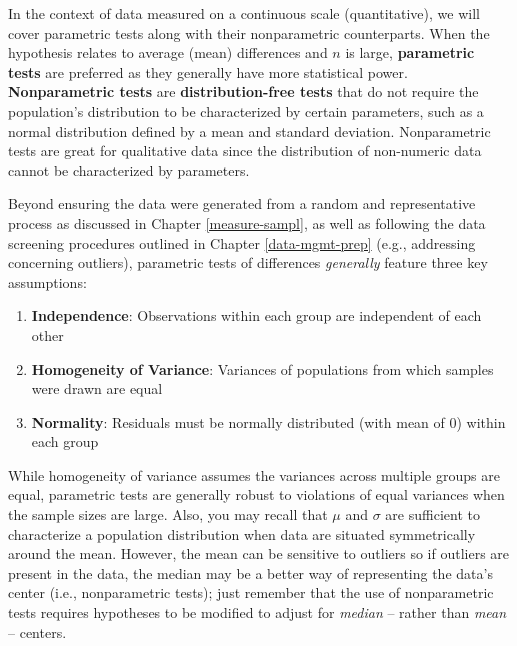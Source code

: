 \documentclass[
]{book}
\providecommand{\tightlist}{%
  \setlength{\itemsep}{0pt}\setlength{\parskip}{0pt}}
\begin{document}
In the context of data measured on a continuous scale (quantitative), we will cover parametric tests along with their nonparametric counterparts. When the hypothesis relates to average (mean) differences and \(n\) is large, \textbf{parametric tests} are preferred as they generally have more statistical power. \textbf{Nonparametric tests} are \textbf{distribution-free tests} that do not require the population's distribution to be characterized by certain parameters, such as a normal distribution defined by a mean and standard deviation. Nonparametric tests are great for qualitative data since the distribution of non-numeric data cannot be characterized by parameters.

Beyond ensuring the data were generated from a random and representative process as discussed in Chapter \ref{measure-sampl}, as well as following the data screening procedures outlined in Chapter \ref{data-mgmt-prep} (e.g., addressing concerning outliers), parametric tests of differences \emph{generally} feature three key assumptions:

\begin{enumerate}
\def\labelenumi{\arabic{enumi}.}
\tightlist
\item
  \textbf{Independence}: Observations within each group are independent of each other
\item
  \textbf{Homogeneity of Variance}: Variances of populations from which samples were drawn are equal
\item
  \textbf{Normality}: Residuals must be normally distributed (with mean of 0) within each group
\end{enumerate}

While homogeneity of variance assumes the variances across multiple groups are equal, parametric tests are generally robust to violations of equal variances when the sample sizes are large. Also, you may recall that \(\mu\) and \(\sigma\) are sufficient to characterize a population distribution when data are situated symmetrically around the mean. However, the mean can be sensitive to outliers so if outliers are present in the data, the median may be a better way of representing the data's center (i.e., nonparametric tests); just remember that the use of nonparametric tests requires hypotheses to be modified to adjust for \emph{median} -- rather than \emph{mean} -- centers.
\end{document}
